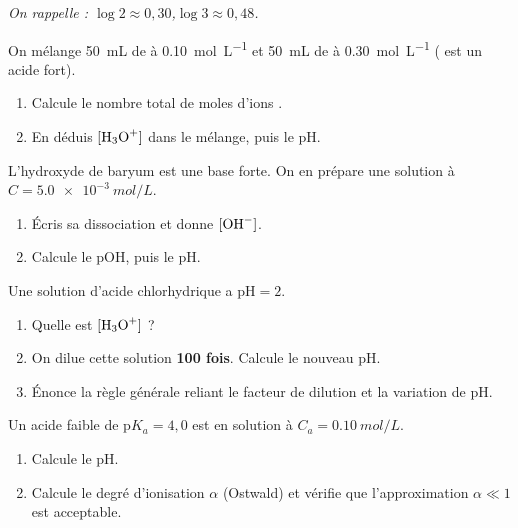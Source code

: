 \documentclass[11pt,a4paper]{article}
\begin{document}
\begin{center}\small\itshape On rappelle : $\log 2 \approx 0{,}30$,\quad $\log 3 \approx 0{,}48$.\end{center}

\begin{exo}
On mélange \qty{50}{mL} de  à \qty{0,10}{mol\per L} et \qty{50}{mL} de  à \qty{0,30}{mol\per L}
( est un acide fort).
\begin{enumerate}[label=\alph*)]
  \item Calcule le nombre total de moles d'ions .
  \item En déduis $[\ce{H3O+}]$ dans le mélange, puis le pH.
\end{enumerate}
\end{exo}

\begin{exo}
L'hydroxyde de baryum  est une base forte. On en prépare une solution à
$C = \qty{5,0e-3}{mol\per L}$.
\begin{enumerate}[label=\alph*)]
  \item Écris sa dissociation et donne $[\ce{OH-}]$.
  \item Calcule le pOH, puis le pH.
\end{enumerate}
\end{exo}

\begin{exo}
Une solution d'acide chlorhydrique a $\mathrm{pH} = 2$.
\begin{enumerate}[label=\alph*)]
  \item Quelle est $[\ce{H3O+}]$ ?
  \item On dilue cette solution \textbf{100 fois}. Calcule le nouveau pH.
  \item Énonce la règle générale reliant le facteur de dilution et la variation de pH.
\end{enumerate}
\end{exo}

\begin{exo}
Un acide faible  de $\mathrm{p}K_a = 4{,}0$ est en solution à $C_a = \qty{0,10}{mol\per L}$.
\begin{enumerate}[label=\alph*)]
  \item Calcule le pH.
  \item Calcule le degré d'ionisation $\alpha$ (Ostwald) et vérifie que l'approximation $\alpha \ll 1$ est
        acceptable.
\end{enumerate}
\end{exo}
\end{document}
